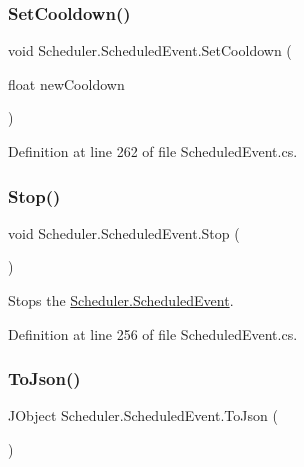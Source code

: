 \subsubsection{\texorpdfstring{Set\+Cooldown()}{SetCooldown()}}
{\footnotesize\ttfamily void Scheduler.\+Scheduled\+Event.\+Set\+Cooldown (\begin{DoxyParamCaption}\item[{float}]{new\+Cooldown }\end{DoxyParamCaption})}



Definition at line 262 of file Scheduled\+Event.\+cs.

\mbox{\label{class_scheduler_1_1_scheduled_event_ac45f7ec5f81d79844b5fcceee0ea09e2}} 
\subsubsection{\texorpdfstring{Stop()}{Stop()}}
{\footnotesize\ttfamily void Scheduler.\+Scheduled\+Event.\+Stop (\begin{DoxyParamCaption}{ }\end{DoxyParamCaption})}



Stops the \hyperlink{class_scheduler_1_1_scheduled_event}{Scheduler.\+Scheduled\+Event}. 



Definition at line 256 of file Scheduled\+Event.\+cs.

\mbox{\label{class_scheduler_1_1_scheduled_event_a16217933397481d05dd690b5a67e3fdb}} 
\subsubsection{\texorpdfstring{To\+Json()}{ToJson()}}
{\footnotesize\ttfamily J\+Object Scheduler.\+Scheduled\+Event.\+To\+Json (\begin{DoxyParamCaption}{ }\end{DoxyParamCaption})}



